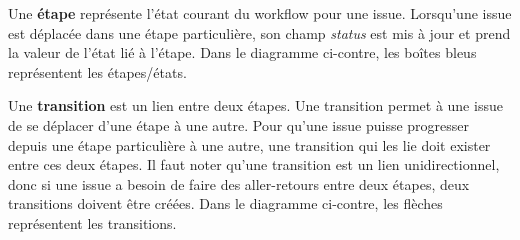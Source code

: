 Une \textbf{étape} représente l'état courant du workflow pour une issue.
Lorsqu'une issue est déplacée dans une étape particulière, son champ
\textit{status} est mis à jour et prend la valeur de l'état lié à l'étape.
Dans le diagramme ci-contre, les boîtes bleus représentent les étapes/états.

Une \textbf{transition} est un lien entre deux étapes. Une transition permet
à une issue de se déplacer d'une étape à une autre. Pour qu'une issue puisse
progresser depuis une étape particulière à une autre, une transition qui les
lie doit exister entre ces deux étapes.
Il faut noter qu'une transition est un lien unidirectionnel, donc si une
issue a besoin de faire des aller-retours entre deux étapes, deux
transitions doivent être créées.
Dans le diagramme ci-contre, les flèches représentent les transitions.

